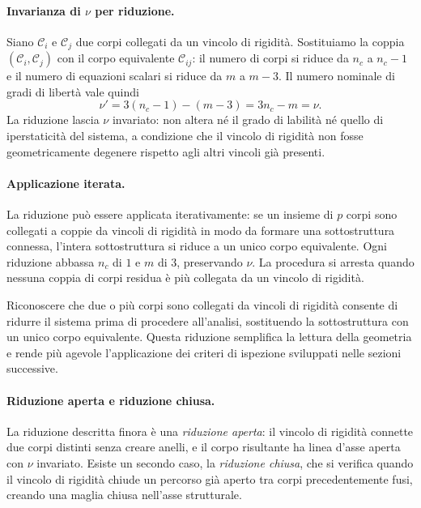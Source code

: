 \paragraph{Invarianza di $\nu$ per riduzione.}
Siano $\mathcal{C}_i$ e $\mathcal{C}_j$ due corpi collegati
da un vincolo di rigidità. Sostituiamo la coppia
$(\mathcal{C}_i, \mathcal{C}_j)$ con il corpo equivalente
$\mathcal{C}_{ij}$: il numero di corpi si riduce da $n_c$
a $n_c - 1$ e il numero di equazioni scalari si riduce da
$m$ a $m - 3$. Il numero nominale di gradi di libertà vale
quindi
\begin{equation}\label{eq:nu_fusione}
	\nu' = 3(n_c - 1) - (m - 3) = 3n_c - m = \nu.
\end{equation}
La riduzione lascia $\nu$ invariato: non altera
né il grado di labilità né quello di iperstaticità del sistema,
a condizione che il vincolo di rigidità non fosse geometricamente
degenere rispetto agli altri vincoli già presenti.


\paragraph{Applicazione iterata.}
La riduzione può essere applicata iterativamente: se un insieme
di $p$ corpi sono collegati a coppie da vincoli di rigidità
in modo da formare una sottostruttura connessa, l'intera
sottostruttura si riduce a un unico corpo equivalente. Ogni
riduzione abbassa $n_c$ di $1$ e $m$ di $3$, preservando $\nu$.
La procedura si arresta quando nessuna coppia di corpi
residua è più collegata da un vincolo di rigidità.

	Riconoscere che due o più corpi sono collegati 
	da vincoli di rigidità consente di ridurre il sistema 
	prima di procedere all'analisi, sostituendo la 
	sottostruttura con un unico corpo equivalente. 
	Questa riduzione semplifica la lettura della geometria 
	e rende più agevole l'applicazione dei criteri di 
	ispezione sviluppati nelle sezioni successive.



\paragraph{Riduzione aperta e riduzione chiusa.}
La riduzione descritta finora è una \emph{riduzione aperta}: il
vincolo di rigidità connette due corpi distinti senza creare
anelli, e il corpo risultante ha linea d'asse aperta con $\nu$
invariato. Esiste un secondo caso, la \emph{riduzione chiusa},
che si verifica quando il vincolo di rigidità chiude un percorso
già aperto tra corpi precedentemente fusi, creando una maglia
chiusa nell'asse strutturale.

